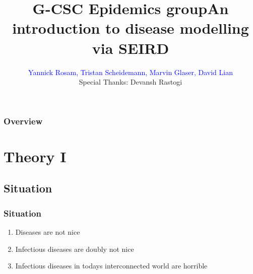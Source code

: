 \documentclass{beamer}
\title[Epidemics Wokrshop]{G-CSC Epidemics group\newline An introduction to disease modelling via SEIRD}
\author{\textcolor{blue}{Yannick Rosam, Tristan Scheidemann, Marvin Glaser, David Lian\\}
\vspace{2mm}\footnotesize{Special Thanks: Devansh Rastogi}} %
\institute[G-CSC] %
{
Goethe Universtiy Frankfurt - Center for Scientific Computing \\ %
\medskip
}
\begin{document}


\begin{frame}
\titlepage %
\end{frame}


\begin{frame}
\frametitle{Overview} 
\tableofcontents 
\end{frame}




\section{Theory I}

\subsection{Situation}

\begin{frame}
	\frametitle{Situation}
	\begin{enumerate}
		\item Diseases are not nice\\\vspace{0.1cm}
	         			
		\item Infectious diseases are doubly not nice \\\vspace{0.1cm}
	       	
                \item Infectious diseases in todays interconnected world are horrible	\\\vspace{0.1cm}
	\end{enumerate}


\end{frame}
\end{document}
